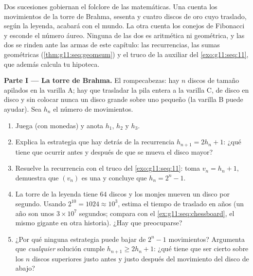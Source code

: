 \begin{problem}
\label{pb:g11:seq:1}
Dos sucesiones gobiernan el folclore de las matemáticas. Una cuenta los
movimientos de la torre de Brahma, sesenta y cuatro discos de oro cuyo
traslado, según la leyenda, acabará con el mundo. La otra cuenta los
conejos de Fibonacci y esconde el número áureo. Ninguna de las dos es
aritmética ni geométrica, y las dos se rinden ante las armas de este
capítulo: las recurrencias, las sumas geométricas
(\cref{thm:g11:seq:geomsum}) y el truco de la  auxiliar del
\cref{exo:g11:seq:11}, que además calcula tu hipoteca.

\medskip
\noindent\textbf{Parte I --- La torre de Brahma.}
El rompecabezas: hay $n$ discos de tamaño  apilados en la
varilla A; hay que trasladar la pila entera a la varilla C, de disco en
disco y sin colocar nunca un disco grande sobre uno pequeño (la varilla B
puede ayudar). Sea $h_n$ el número  de movimientos.
\begin{enumerate}
  \item Juega (con monedas) y anota $h_1$, $h_2$ y $h_3$.
  \item Explica la estrategia que hay detrás de la recurrencia
        $h_{n+1} = 2h_n + 1$: ¿qué tiene que ocurrir antes y después de
        que se mueva el disco mayor?
  \item Resuelve la recurrencia con el truco del \cref{exo:g11:seq:11}:
        toma $v_n = h_n + 1$, demuestra que $(v_n)$ es una  y concluye que $h_n = 2^n - 1$.
  \item La torre de la leyenda tiene $64$ discos y los monjes mueven un
        disco por segundo. Usando $2^{10} = 1024 \approx 10^3$, estima el
        tiempo de traslado en años (un año son unos $3 \times 10^7$
        segundos; compara con el \cref{ex:g11:seq:chessboard}, el mismo
        gigante en otra historia). ¿Hay que preocuparse?
  \item ¿Por qué ninguna estrategia puede bajar de $2^n - 1$ movimientos?
        Argumenta que \emph{cualquier} solución cumple
        $h_{n+1} \geq 2 h_n + 1$: ¿qué tiene que ser cierto sobre los $n$
        discos superiores justo antes y justo después del movimiento del
        disco de abajo?
\end{enumerate}


\end{problem}
